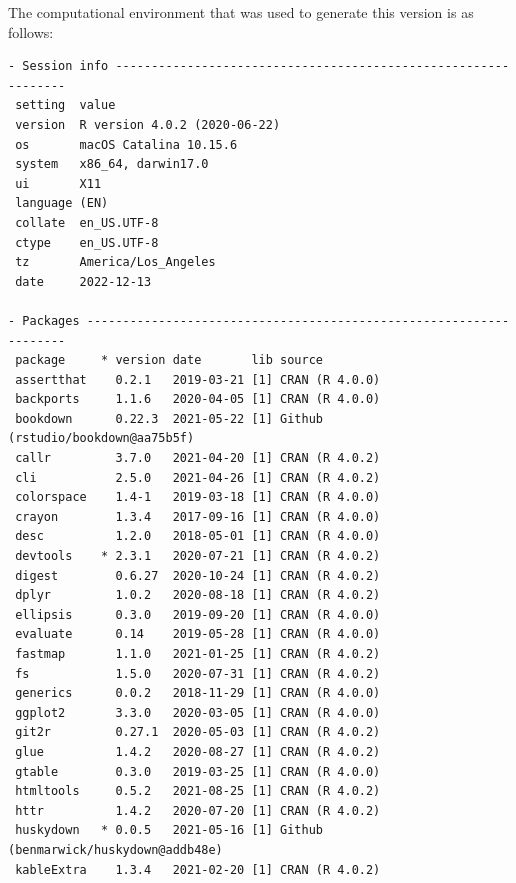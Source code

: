\documentclass [11pt, proquest] {uwthesis}[2015/03/03]
\begin{document}
The computational environment that was used to generate this version is
as follows:
\begin{verbatim}
- Session info ---------------------------------------------------------------
 setting  value                       
 version  R version 4.0.2 (2020-06-22)
 os       macOS Catalina 10.15.6      
 system   x86_64, darwin17.0          
 ui       X11                         
 language (EN)                        
 collate  en_US.UTF-8                 
 ctype    en_US.UTF-8                 
 tz       America/Los_Angeles         
 date     2022-12-13                  

- Packages -------------------------------------------------------------------
 package     * version date       lib source                               
 assertthat    0.2.1   2019-03-21 [1] CRAN (R 4.0.0)                       
 backports     1.1.6   2020-04-05 [1] CRAN (R 4.0.0)                       
 bookdown      0.22.3  2021-05-22 [1] Github (rstudio/bookdown@aa75b5f)    
 callr         3.7.0   2021-04-20 [1] CRAN (R 4.0.2)                       
 cli           2.5.0   2021-04-26 [1] CRAN (R 4.0.2)                       
 colorspace    1.4-1   2019-03-18 [1] CRAN (R 4.0.0)                       
 crayon        1.3.4   2017-09-16 [1] CRAN (R 4.0.0)                       
 desc          1.2.0   2018-05-01 [1] CRAN (R 4.0.0)                       
 devtools    * 2.3.1   2020-07-21 [1] CRAN (R 4.0.2)                       
 digest        0.6.27  2020-10-24 [1] CRAN (R 4.0.2)                       
 dplyr         1.0.2   2020-08-18 [1] CRAN (R 4.0.2)                       
 ellipsis      0.3.0   2019-09-20 [1] CRAN (R 4.0.0)                       
 evaluate      0.14    2019-05-28 [1] CRAN (R 4.0.0)                       
 fastmap       1.1.0   2021-01-25 [1] CRAN (R 4.0.2)                       
 fs            1.5.0   2020-07-31 [1] CRAN (R 4.0.2)                       
 generics      0.0.2   2018-11-29 [1] CRAN (R 4.0.0)                       
 ggplot2       3.3.0   2020-03-05 [1] CRAN (R 4.0.0)                       
 git2r         0.27.1  2020-05-03 [1] CRAN (R 4.0.2)                       
 glue          1.4.2   2020-08-27 [1] CRAN (R 4.0.2)                       
 gtable        0.3.0   2019-03-25 [1] CRAN (R 4.0.0)                       
 htmltools     0.5.2   2021-08-25 [1] CRAN (R 4.0.2)                       
 httr          1.4.2   2020-07-20 [1] CRAN (R 4.0.2)                       
 huskydown   * 0.0.5   2021-05-16 [1] Github (benmarwick/huskydown@addb48e)
 kableExtra    1.3.4   2021-02-20 [1] CRAN (R 4.0.2)                       

\end{verbatim}
\end{document}
